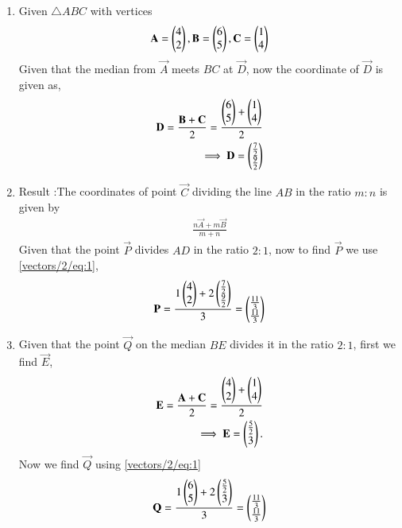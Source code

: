 \begin{enumerate}[label=\alph*.]
    \item  Given $\triangle ABC$ with vertices
    \begin{align}
      \mathbf{A} = \begin{pmatrix}4 \\ 2\end{pmatrix}, \mathbf{B}=\begin{pmatrix}6 \\ 5\end{pmatrix},         \mathbf{C}=\begin{pmatrix}1 \\ 4\end{pmatrix}  
    \end{align}
    Given that the median from $\vec{A}$ meets $BC$ at $\vec{D}$, now the coordinate of $\vec{D}$ is given as,
    \begin{align}
        \mathbf{D} = \frac{\mathbf{B}+\mathbf{C}}{2} = \frac{\begin{pmatrix}6 \\ 5\end{pmatrix}+\begin{pmatrix}1 \\ 4\end{pmatrix}}{2}\\
        \implies \mathbf{D} = \begin{pmatrix}\frac{7}{2} \\ \frac{9}{2}\end{pmatrix}
    \end{align}
    \item  Result :The coordinates of point $\vec{C}$ dividing the line $AB$ in the ratio $m:n$ is given by 
    \begin{align}
      \frac{n\vec{A}+m\vec{B}}{m+n}  \label{vectors/2/eq:1}
    \end{align}
    Given that the point $\vec{P}$ divides $AD$ in the ratio $2:1$, now to find $\vec{P}$ we use \eqref{vectors/2/eq:1},
    \begin{align}
        \mathbf{P}=\frac{1\begin{pmatrix}4\\2\end{pmatrix}+2\begin{pmatrix}\frac{7}{2}\\ \frac{9}{2}\end{pmatrix}}{3}=\begin{pmatrix}\frac{11}{3} \\ \frac{11}{3}\end{pmatrix}
    \end{align}
    \item Given that the point $\vec{Q}$ on the median $BE$ divides it in the ratio $2:1$, first we find $\vec{E}$,
    \begin{align}
        \mathbf{E} =\frac{\mathbf{A}+\mathbf{C}}{2} = \frac{\begin{pmatrix}4 \\ 2\end{pmatrix}+\begin{pmatrix}1 \\ 4\end{pmatrix}}{2}\\
        \implies \mathbf{E} = \begin{pmatrix}\frac{5}{2} \\ 3\end{pmatrix}.
    \end{align}
    Now we find $\vec{Q}$ using \eqref{vectors/2/eq:1}
    \begin{align}
       \vec{Q}=\frac{1\myvec{6\\5}+2\myvec{\frac{5}{2}\\3}}{3}=\myvec{\frac{11}{3} \\ \frac{11}{3}} 

\end{align}
\end{enumerate}

